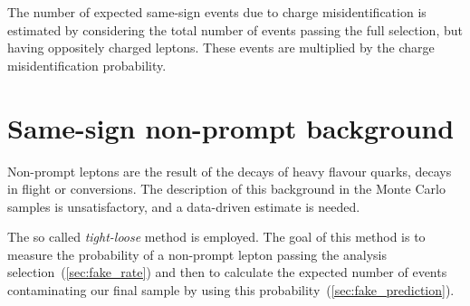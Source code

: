 The number of expected same-sign events due to charge misidentification is estimated by considering the total number of events passing the 
full selection, but having oppositely charged leptons. These events are
multiplied by
the charge misidentification probability.

\section{Same-sign non-prompt background}
Non-prompt leptons are the result of the decays of heavy flavour quarks,
decays in flight or conversions. The description of this background in the
Monte Carlo samples is unsatisfactory, and a data-driven estimate is needed.

The so called \emph{tight-loose} method is employed. 
The goal of this method is to measure the probability of a non-prompt lepton
passing the analysis selection~(\ref{sec:fake_rate}) and then to calculate the expected number of
events contaminating our final sample by using this
probability~(\ref{sec:fake_prediction}).


